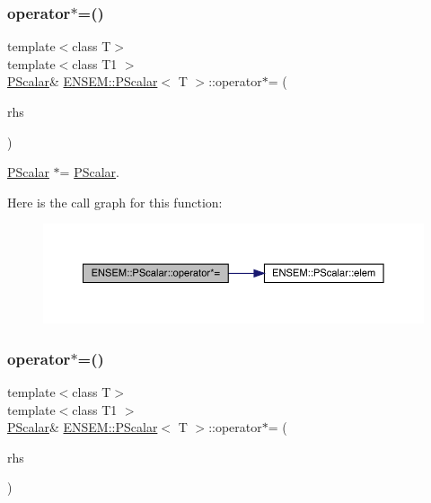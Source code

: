 \subsubsection{\texorpdfstring{operator$\ast$=()}{operator*=()}\hspace{0.1cm}{\footnotesize\ttfamily [1/3]}}
{\footnotesize\ttfamily template$<$class T$>$ \\
template$<$class T1 $>$ \\
\mbox{\hyperlink{classENSEM_1_1PScalar}{P\+Scalar}}\& \mbox{\hyperlink{classENSEM_1_1PScalar}{E\+N\+S\+E\+M\+::\+P\+Scalar}}$<$ T $>$\+::operator$\ast$= (\begin{DoxyParamCaption}\item[{const \mbox{\hyperlink{classENSEM_1_1PScalar}{P\+Scalar}}$<$ T1 $>$ \&}]{rhs }\end{DoxyParamCaption})\hspace{0.3cm}{\ttfamily [inline]}}



\mbox{\hyperlink{classENSEM_1_1PScalar}{P\+Scalar}} $\ast$= \mbox{\hyperlink{classENSEM_1_1PScalar}{P\+Scalar}}. 

Here is the call graph for this function\+:
\nopagebreak
\begin{figure}[H]
\begin{center}
\leavevmode
\includegraphics[width=350pt]{d3/d27/classENSEM_1_1PScalar_addccfa9164f9d80554657387932185c4_cgraph}
\end{center}
\end{figure}
\mbox{\label{classENSEM_1_1PScalar_addccfa9164f9d80554657387932185c4}} 
\subsubsection{\texorpdfstring{operator$\ast$=()}{operator*=()}\hspace{0.1cm}{\footnotesize\ttfamily [2/3]}}
{\footnotesize\ttfamily template$<$class T$>$ \\
template$<$class T1 $>$ \\
\mbox{\hyperlink{classENSEM_1_1PScalar}{P\+Scalar}}\& \mbox{\hyperlink{classENSEM_1_1PScalar}{E\+N\+S\+E\+M\+::\+P\+Scalar}}$<$ T $>$\+::operator$\ast$= (\begin{DoxyParamCaption}\item[{const \mbox{\hyperlink{classENSEM_1_1PScalar}{P\+Scalar}}$<$ T1 $>$ \&}]{rhs }\end{DoxyParamCaption})\hspace{0.3cm}{\ttfamily [inline]}}



